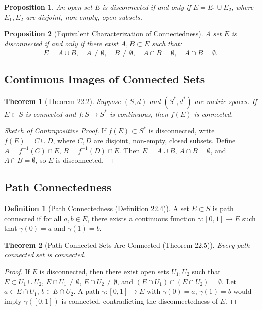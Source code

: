 \documentclass[9pt]{article}
\theoremstyle{definition}
\newtheorem{definition}{Definition}
\theoremstyle{plain}
\newtheorem{theorem}{Theorem}
\newtheorem{proposition}{Proposition}
\begin{document}
\begin{proposition}
An open set \( E \) is disconnected if and only if \( E = E_1 \cup E_2 \), where \( E_1, E_2 \) are disjoint, non-empty, open subsets.
\end{proposition}

\begin{proposition}[Equivalent Characterization of Connectedness]
A set \( E \) is disconnected if and only if there exist \( A, B \subset E \) such that:
\[
E = A \cup B, \quad A \neq \emptyset, \quad B \neq \emptyset, \quad A \cap \overline{B} = \emptyset, \quad \overline{A} \cap B = \emptyset.
\]
\end{proposition}

\subsection*{Continuous Images of Connected Sets}
\begin{theorem}[Theorem 22.2]
Suppose \( (S, d) \) and \( (S^*, d^*) \) are metric spaces. If \( E \subset S \) is connected and \( f : S \to S^* \) is continuous, then \( f(E) \) is connected.
\end{theorem}

\begin{proof}[Sketch of Contrapositive Proof]
If \( f(E) \subset S^* \) is disconnected, write \( f(E) = C \cup D \), where \( C, D \) are disjoint, non-empty, closed subsets. Define \( A = f^{-1}(C) \cap E \), \( B = f^{-1}(D) \cap E \). Then \( E = A \cup B \), \( A \cap \overline{B} = \emptyset \), and \( \overline{A} \cap B = \emptyset \), so \( E \) is disconnected.
\end{proof}

\subsection*{Path Connectedness}
\begin{definition}[Path Connectedness (Definition 22.4)]
A set \( E \subset S \) is path connected if for all \( a, b \in E \), there exists a continuous function \( \gamma : [0, 1] \to E \) such that \( \gamma(0) = a \) and \( \gamma(1) = b \).
\end{definition}

\begin{theorem}[Path Connected Sets Are Connected (Theorem 22.5)]
Every path connected set is connected.
\end{theorem}

\begin{proof}
If \( E \) is disconnected, then there exist open sets \( U_1, U_2 \) such that \( E \subset U_1 \cup U_2 \), \( E \cap U_1 \neq \emptyset \), \( E \cap U_2 \neq \emptyset \), and \( (E \cap U_1) \cap (E \cap U_2) = \emptyset \). Let \( a \in E \cap U_1 \), \( b \in E \cap U_2 \). A path \( \gamma : [0, 1] \to E \) with \( \gamma(0) = a \), \( \gamma(1) = b \) would imply \( \gamma([0, 1]) \) is connected, contradicting the disconnectedness of \( E \).
\end{proof}
\end{document}
